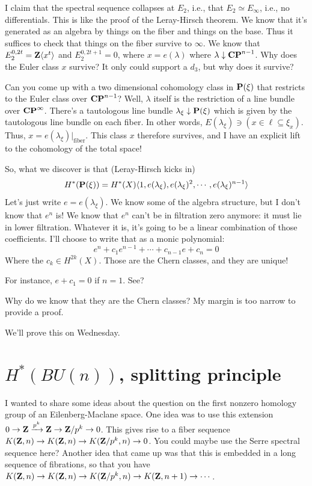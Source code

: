 I claim that the spectral sequence collapses at $E_2$, i.e., that $E_2 \simeq E_\infty$, i.e., no differentials.
This is like the proof of the Leray-Hirsch theorem.
We know that it's generated as an algebra by things on the fiber and things on the base.
Thus it suffices to check that things on the fiber survive to $\infty$.
We know that $E_2^{0,2t} = \mathbf Z\langle x^t\rangle$ and $E_2^{0,2t+1} = 0$, where $x = e(\lambda)$ where $\lambda\downarrow\mathbf{CP}^{n-1}$.
Why does the Euler class $x$ survive?
It only could support a $d_3$, but why does it survive?

Can you come up with a two dimensional cohomology class in $\mathbf P(\xi)$ that restricts to the Euler class over $\mathbf{CP}^{n-1}$?
Well, $\lambda$ itself is the restriction of a line bundle over $\mathbf{CP}^\infty$.
There's a tautologous line bundle $\lambda_\xi \downarrow \mathbf P(\xi)$ which is given by the tautologous line bundle on each fiber.
In other words, $E(\lambda_\xi)\ni(x\in \ell\subseteq\xi_x)$.
Thus, $x = e(\lambda_\xi)|_\text{fiber}$.
This class $x$ therefore survives, and I have an explicit lift to the cohomology of the total space!

So, what we discover is that (Leray-Hirsch kicks in)
$$
H^\ast(\mathbf P(\xi)) = H^\ast(X)\langle 1, e(\lambda_\xi), e(\lambda_\xi)^2, \cdots, e(\lambda_\xi)^{n-1}\rangle
$$
Let's just write $e = e(\lambda_\xi)$.
We know some of the algebra structure, but I don't know that $e^n$ is!
We know that $e^n$ can't be in filtration zero anymore: it must lie in lower filtration.
Whatever it is, it's going to be a linear combination of those coefficients.
I'll choose to write that as a monic polynomial:
$$
e^n + c_1e^{n-1} + \cdots + c_{n-1} e + c_n = 0
$$
Where the $c_k \in H^{2k}(X)$.
Those are the Chern classes, and they are unique!

For instance, $e+c_1 = 0$ if $n=1$. See?

\begin{question}
    Why do we know that they are the Chern classes?
    My margin is too narrow to provide a proof.
\end{question}
We'll prove this on Wednesday.
\section{$H^\ast(BU(n))$, splitting principle}
I wanted to share some ideas about the question on the first nonzero homology group of an Eilenberg-Maclane space.
One idea was to use this extension $0\to \mathbf Z\xrightarrow{{p^k}}\mathbf Z\to \mathbf Z/p^k\to 0$.
This gives rise to a fiber sequence $K(\mathbf Z,n)\to K(\mathbf Z,n)\to K(\mathbf Z/p^k,n)\to 0$.
You could maybe use the Serre spectral sequence here?
Another idea that came up was that this is embedded in a long sequence of fibrations, so that you have $K(\mathbf Z,n)\to K(\mathbf Z,n)\to K(\mathbf Z/p^k, n) \to K(\mathbf Z,n+1)\to\cdots$.

